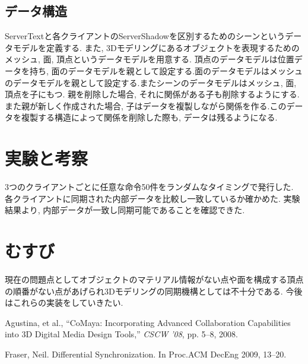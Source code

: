 \documentclass{AIabst}
\begin{document}
  \subsection{データ構造}
  ServerTextと各クライアントのServerShadowを区別するためのシーンというデータモデルを定義する.
  また, 3Dモデリングにあるオブジェクトを表現するためのメッシュ, 面, 頂点というデータモデルを用意する.
  頂点のデータモデルは位置データを持ち, 面のデータモデルを親として設定する.面のデータモデルはメッシュのデータモデルを親として設定する.またシーンのデータモデルはメッシュ, 面, 頂点を子にもつ. 親を削除した場合, それに関係がある子も削除するようにする. また親が新しく作成された場合, 子はデータを複製しながら関係を作る.このデータを複製する構造によって関係を削除した際も, データは残るようになる.
\section{実験と考察}
 3つのクライアントごとに任意な命令50件をランダムなタイミングで発行した.
  各クライアントに同期された内部データを比較し一致しているか確かめた.
  実験結果より, 内部データが一致し同期可能であることを確認できた.
\section{むすび}
 現在の問題点としてオブジェクトのマテリアル情報がない点や面を構成する頂点の順番がない点があげられ3Dモデリングの同期機構としては不十分である.
今後はこれらの実装をしていきたい.

\begin{thebibliography}{9}
	Agustina, et al., ``CoMaya: Incorporating Advanced Collaboration Capabilities into 3D Digital Media Design Tools,'' {\it CSCW '08}, pp. 5--8, 2008.

  Fraser,	Neil.	Differential Synchronization. In Proc.ACM DecEng 2009, 13--20.
\end{thebibliography}
\end{document}
